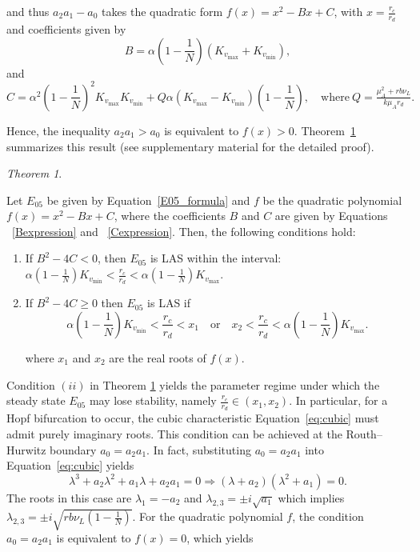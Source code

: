 \documentclass{article}
\theoremstyle{remark}
\theoremstyle{custom} %
\newtheorem{theorem}{Theorem}
\begin{document}
and thus $a_2 a_1 - a_0$ takes the quadratic form   $f(x) = x^2 - Bx + C$, with $ x = \frac{r_c}{r_d}$ and  coefficients given by
\begin{equation} 
\label{Bexpression}
    B = \alpha \left(1 - \frac{1}{N}\right) \left(K_{v_{\max}} + K_{v_{\min}}\right), 
\end{equation}
and 
\begin{equation} 
\label{Cexpression}
    C = \alpha^2 \left(1 - \frac{1}{N}\right)^2 K_{v_{\max}} K_{v_{\min}} 
    + Q \alpha \left(K_{v_{\max}} - K_{v_{\min}}\right) \left(1 - \frac{1}{N}\right), \quad \text{where} \ Q = \tfrac{\mu_A^2 + r b \nu_L}{k \mu_A r_d}.
\end{equation}  

Hence, the inequality $a_2 a_1 > a_0$ is equivalent to $f(x) > 0$. Theorem~\ref{thm: Game-theoretic Model_} summarizes this result (see supplementary material for the detailed proof).


\color{black}


\begin{theorem}\label{thm: Game-theoretic Model_}

Let $E_{05}$ be given by Equation~\eqref{E05_formula} and   $f$ be the quadratic polynomial $f(x) = x^2 - Bx + C$, where the coefficients \( B \) and \( C \) are given by Equations ~\eqref{Bexpression} and ~\eqref{Cexpression}. Then, the following conditions hold:

\begin{enumerate}

\item[{(i)}] If $B^2-4 C<0$, then $E_{05}$ is LAS within the interval: 
$\alpha\left(1-\frac{1}{N}\right) K_{v_{\min }}<\frac{r_c}{r_d}<\alpha\left(1-\frac{1}{N}\right) K_{v_{\max }}$.


\item[{(ii)}] If \( B^2 - 4C \geq 0 \)
then $E_{05}$ is LAS if
\[
\alpha \left(1 - \frac{1}{N} \right) K_{v_{\min}} < \frac{r_c}{r_d} < x_1 \quad 
\text{or} \quad
x_2 < \frac{r_c}{r_d} < \alpha \left(1 - \frac{1}{N} \right) K_{v_{\max}}.
\]

where $x_1$ and $x_2$ are the real roots of $f(x).$

\end{enumerate}
\end{theorem}



Condition $(ii)$ in Theorem \ref{thm: Game-theoretic Model_} yields the parameter regime under which the steady state $E_{05}$ may lose stability, namely $\frac{r_c}{r_d} \in (x_1,x_2)$. In particular, for a Hopf bifurcation to occur, the cubic characteristic Equation~\eqref{eq:cubic} must admit purely imaginary roots. This condition can be achieved at the Routh–Hurwitz boundary $a_0=a_2 a_1$. In fact,  substituting $a_0=a_2 a_1$ into Equation~\eqref{eq:cubic} yields
$$
 \lambda^3+a_2 \lambda^2+a_1 \lambda+a_2 a_1=0 
\Rightarrow \left(\lambda+a_2\right)\left(\lambda^2+a_1\right)=0.
$$
The roots in this case are $\lambda_1=-a_2$ and $\lambda_{2,3}= \pm i \sqrt{a_1}$ which implies $\lambda_{2,3}= \pm i \sqrt{r b \nu_L\left(1-\frac{1}{N}\right)}.$  For the quadratic polynomial $f$, the condition $a_0 = a_2 a_1$ is equivalent to $f(x) = 0$, which yields
\end{document}

